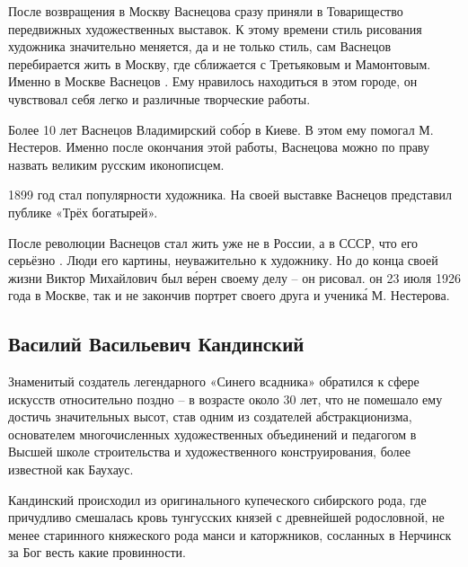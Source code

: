 После возвращения в Москву Васнецова сразу приняли в Товарищество передвижных художественных выставок. К этому времени стиль рисования художника значительно меняется, да и не только стиль, сам Васнецов перебирается жить в Москву, где сближается с Третьяковым и Мамонтовым. Именно в Москве Васнецов . Ему нравилось находиться в этом городе, он чувствовал себя легко и  различные творческие работы.

Более 10 лет Васнецов  Владимирский соб\'{о}р в Киеве. В этом ему помогал М. Нестеров. Именно после окончания этой работы, Васнецова можно по праву назвать великим русским иконописцем.

1899 год стал  популярности художника. На своей выставке Васнецов представил публике «Трёх богатырей».

После революции Васнецов стал жить уже не в России, а в СССР, что его серьёзно . Люди  его картины,  неуважительно к художнику. Но до конца своей жизни Виктор Михайлович был в\'{е}рен своему делу -- он рисовал.  он 23 июля 1926 года в Москве, так и не закончив портрет своего друга и ученик\'{а} М. Нестерова.

\subsection{Василий Васильевич Кандинский}
Знаменитый создатель легендарного «Синего всадника» обратился к сфере искусств относительно поздно -- в возрасте около 30 лет, что не помешало ему достичь значительных высот, став одним из создателей абстракционизма, основателем многочисленных художественных объединений и педагогом в Высшей школе строительства и художественного конструирования, более известной как Баухаус.

Кандинский происходил из оригинального купеческого сибирского рода, где причудливо смешалась кровь тунгусских князей с древнейшей родословной, не менее старинного княжеского рода манси и каторжников, сосланных в Нерчинск за Бог весть какие провинности.

